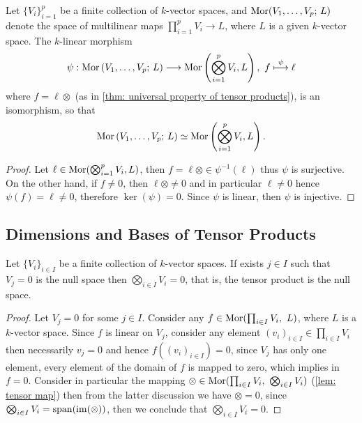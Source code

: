 \begin{corollary}
    \label{cor: multilinear maps are isomorphic to linear maps}
    Let \(\{V_i\}_{i=1}^p\) be a finite collection of \(k\)-vector spaces, and
    \(\operatorname{Mor}(V_1, \dots, V_p;\, L)\) denote the space of multilinear maps
    \(\prod_{i=1}^p V_i \to L\), where \(L\) is a given \(k\)-vector space. The
    \(k\)-linear morphism
    \[
        \psi :
        \operatorname{Mor}\left(V_1, \dots, V_p;\, L\right) \longrightarrow
        \operatorname{Mor}\left( \bigotimes_{i=1}^p V_i, L \right),\
        f \overset{\psi}\longmapsto \ell
    \]
    where \(f = \ell \otimes\) (as in \cref{thm: universal property of tensor
        products}), is an isomorphism, so that
    \[
        \operatorname{Mor}\left(V_1, \dots, V_p;\, L\right) \simeq
        \operatorname{Mor}\left( \bigotimes_{i=1}^p V_i, L \right).
    \]
\end{corollary}

\begin{proof}
    Let \(\ell \in \operatorname{Mor}(\bigotimes_{i=1}^p V_i, L)\), then \(f = \ell \otimes
    \in \psi^{-1}(\ell)\) thus \(\psi\) is surjective. On the other hand, if
    \(f \neq 0\), then \(\ell \otimes \neq 0\) and in particular \(\ell \neq 0\)
    hence \(\psi(f) = \ell \neq 0\), therefore \(\ker(\psi) = 0\). Since \(\psi\)
    is linear, then \(\psi\) is injective.
\end{proof}

\subsection{Dimensions and Bases of Tensor Products}

\begin{proposition}
    Let \(\{V_i\}_{i \in I}\) be a finite collection of \(k\)-vector spaces. If
    exists \(j \in I\) such that \(V_j = 0\) is the null space then \(\bigotimes_{i \in
        I} V_i = 0\), that is, the tensor product is the null space.
\end{proposition}

\begin{proof}
    Let \(V_j = 0\) for some \(j \in I\). Consider any \(f \in \operatorname{Mor}(\prod_{i
        \in I} V_i,\ L)\), where \(L\) is a \(k\)-vector space. Since \(f\) is linear
    on \(V_j\), consider any element \((v_i)_{i \in I} \in \prod_{i \in I} V_i\)
    then necessarily \(v_j = 0\) and hence \(f((v_i)_{i \in I}) = 0\), since
    \(V_j\) has only one element, every element of the domain of \(f\) is mapped
    to zero, which implies in \(f = 0\). Consider in particular the mapping \(\otimes
    \in \operatorname{Mor}(\prod_{i \in I} V_i ,\ \bigotimes_{i \in I} V_i)\) (\cref{lem: tensor
        map}) then from the latter discussion we have \(\otimes = 0\), since \(\bigotimes_{i
        \in I} V_i = \operatorname{span}(\operatorname{im}(\otimes))\), then we conclude that \(\bigotimes_{i
        \in I} V_i = 0\).
\end{proof}

